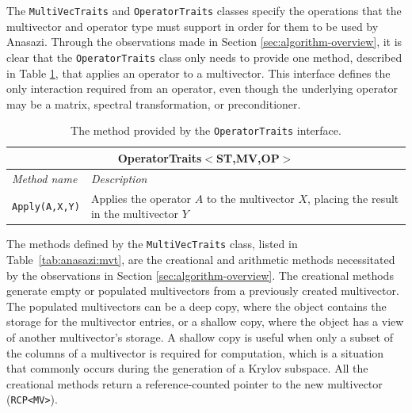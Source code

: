 \documentclass[acmtoms]{acmtrans2m}
\newcounter{algorithm}
\newcommand{\aspace}[1]{\texttt{#1}}
\begin{document}
The \aspace{MultiVecTraits} and \aspace{OperatorTraits} classes specify
the operations that the multivector and operator type must support in order for them to be
used by Anasazi. Through the observations made in Section \ref{sec:algorithm-overview}, 
it is clear that the \aspace{OperatorTraits} class only needs to provide one method,
described in Table \ref{tab:anasazi:opt}, that applies an operator to a multivector.  
This interface defines the only interaction required from an operator, even though
the underlying operator may be a matrix, 
spectral transformation, or preconditioner.
\begin{table}[bth]
\begin{center}
  \caption{The method provided by the \aspace{OperatorTraits} interface.}
\label{tab:anasazi:opt}
\begin{tabular}{| p{4cm} | p{8cm} |}
\hline
\multicolumn{2}{|c|}{\textbf{OperatorTraits$<$ST,MV,OP$>$}} \\\hline
\emph{Method name} & \emph{Description} \\\hline
{\tt Apply(A,X,Y)} & Applies the operator $A$ to the multivector $X$, placing the
result in the multivector $Y$ \\
\hline
\end{tabular}
\end{center}
\end{table}

The methods defined by the \aspace{MultiVecTraits} class, listed in
Table~\ref{tab:anasazi:mvt}, are the creational and arithmetic methods necessitated
by the observations in Section \ref{sec:algorithm-overview}.
The creational methods generate empty or populated multivectors from a previously
created multivector. The populated multivectors can be 
a deep copy, where the object contains the storage for the multivector entries, or a shallow copy, 
where the object has a view of another multivector's storage.
A shallow copy is useful when only a
subset of the columns of a multivector is required for computation, which is a situation that 
commonly occurs during the generation of a Krylov subspace. All the creational methods return
a reference-counted pointer \cite{Detlefs:1992:GCR,Teuchos-RCP} to the new multivector (\aspace{RCP<MV>}). 

\end{document}
